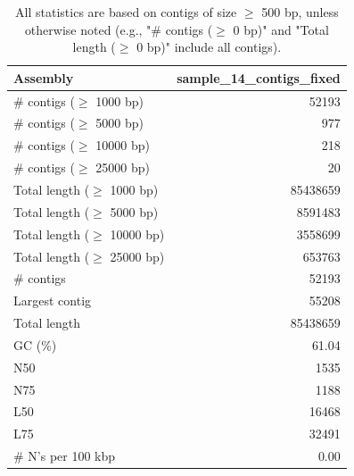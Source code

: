 \documentclass[12pt,a4paper]{article}
\begin{document}
\begin{table}[ht]
\begin{center}
\caption{All statistics are based on contigs of size $\geq$ 500 bp, unless otherwise noted (e.g., "\# contigs ($\geq$ 0 bp)" and "Total length ($\geq$ 0 bp)" include all contigs).}
\begin{tabular}{|l*{1}{|r}|}
\hline
Assembly & sample\_14\_contigs\_fixed \\ \hline
\# contigs ($\geq$ 1000 bp) & 52193 \\ \hline
\# contigs ($\geq$ 5000 bp) & 977 \\ \hline
\# contigs ($\geq$ 10000 bp) & 218 \\ \hline
\# contigs ($\geq$ 25000 bp) & 20 \\ \hline
Total length ($\geq$ 1000 bp) & 85438659 \\ \hline
Total length ($\geq$ 5000 bp) & 8591483 \\ \hline
Total length ($\geq$ 10000 bp) & 3558699 \\ \hline
Total length ($\geq$ 25000 bp) & 653763 \\ \hline
\# contigs & 52193 \\ \hline
Largest contig & 55208 \\ \hline
Total length & 85438659 \\ \hline
GC (\%) & 61.04 \\ \hline
N50 & 1535 \\ \hline
N75 & 1188 \\ \hline
L50 & 16468 \\ \hline
L75 & 32491 \\ \hline
\# N's per 100 kbp & 0.00 \\ \hline
\end{tabular}
\end{center}
\end{table}
\end{document}
